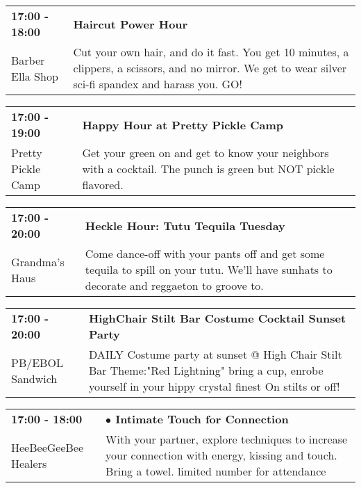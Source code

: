\begin{tabular}{ p{1in} p{2.2in} }
    \textbf{17:00 - 18:00} & \textbf{Haircut Power Hour} \\
    Barber Ella Shop \newline  & Cut your own hair, and do it fast. You get 10 minutes, a clippers, a scissors, and no mirror. We get to wear silver sci-fi spandex and harass you. GO! \\
    \hline 
\end{tabular}
    
\begin{tabular}{ p{1in} p{2.2in} }
    \textbf{17:00 - 19:00} & \textbf{Happy Hour at Pretty Pickle Camp} \\
    Pretty Pickle Camp \newline  & Get your green on and get to know your neighbors with a cocktail. The punch is green but NOT pickle flavored. \\
    \hline 
\end{tabular}
    
\begin{tabular}{ p{1in} p{2.2in} }
    \textbf{17:00 - 20:00} & \textbf{Heckle Hour: Tutu Tequila Tuesday} \\
    Grandma's Haus \newline  & Come dance-off with your pants off and get some tequila to spill on your tutu. We'll have sunhats to decorate and reggaeton to groove to. \\
    \hline 
\end{tabular}
    
\begin{tabular}{ p{1in} p{2.2in} }
    \textbf{17:00 - 20:00} & \textbf{HighChair Stilt Bar Costume Cocktail Sunset Party } \\
    PB/EBOL Sandwich \newline  & DAILY Costume party at sunset @ High Chair Stilt Bar Theme:"Red Lightning" bring a cup, enrobe yourself in your hippy crystal finest On stilts or off! \\
    \hline 
\end{tabular}
    
\begin{tabular}{ p{1in} p{2.2in} }
    \textbf{17:00 - 18:00} & \textbf{$\bullet$	Intimate Touch for Connection} \\
    HeeBeeGeeBee Healers \newline  & With your partner, explore techniques to increase your connection with energy, kissing and touch. Bring a towel. limited number for attendance \\
    \hline 
\end{tabular}
    
